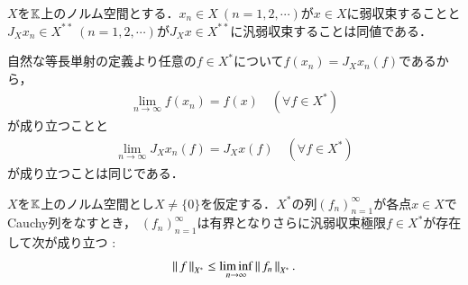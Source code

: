 	\begin{screen}
		\begin{thm}[弱収束と自然な等長単射の関係]
			$X$を$\mathbb{K}$上のノルム空間とする．$x_n \in X\ (n=1,2,\cdots)$が$x \in X$に弱収束することと
			$J_Xx_n \in X^{**}\ (n=1,2,\cdots)$が$J_Xx \in X^{**}$に汎弱収束することは同値である．
			\label{thm:weak_convergence_and_canonical_injection}
		\end{thm}
	\end{screen}
	
	\begin{prf}
		自然な等長単射の定義より任意の$f \in X^*$について$f(x_n) = J_X x_n(f)$であるから，
		\begin{align}
			\lim_{n \to \infty} f(x_n) = f(x) \quad (\forall f \in X^*)
		\end{align}
		が成り立つことと
		\begin{align}
			\lim_{n \to \infty} J_X x_n(f) = J_X x(f) \quad (\forall f \in X^*)
		\end{align}
		が成り立つことは同じである．
		\QED
	\end{prf}
	
	\begin{screen}
		\begin{thm}[汎弱収束列の有界性]
			$X$を$\mathbb{K}$上のノルム空間とし$X \neq \{0\}$を仮定する．$X^*$の列$(f_n)_{n=1}^{\infty}$が各点$x \in X$でCauchy列をなすとき，
			$(f_n)_{n=1}^{\infty}$は有界となりさらに汎弱収束極限$f \in X^*$が存在して次が成り立つ \footnotemark:
			\begin{align}
				\left\|\, f\, \right\|_{X^*} \leq \liminf_{n \to \infty} \left\|\, f_n\, \right\|_{X^*}.
			\end{align}
			\label{thm:weak_star_convergence_bonded}
		\end{thm}
	\end{screen}
	
	
